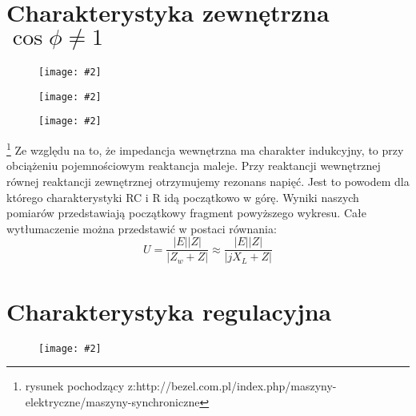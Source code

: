 \documentclass[12pt]{article}
\newcommand{\obrazek}[2]
{
	\begin{figure}[H]
	\centering
	\texttt{[image: \#2]}
	\end{figure}
}
\begin{document}
\section{Charakterystyka zewnętrzna $\cos\phi\neq1$}
	\obrazek{5}{tabele/cosfinie1}
	\obrazek{12}{wykresy/cosfinie1}
	\obrazek{12}{wykresy/wytlumaczenie}\footnote{rysunek pochodzący z:\newline http://bezel.com.pl/index.php/maszyny-elektryczne/maszyny-synchroniczne}
	Ze względu na to, że impedancja wewnętrzna ma charakter indukcyjny, to przy obciążeniu pojemnościowym reaktancja maleje. Przy reaktancji wewnętrznej równej reaktancji zewnętrznej otrzymujemy rezonans napięć. Jest to powodem dla którego charakterystyki RC i R idą początkowo w górę. 
	Wyniki naszych pomiarów przedstawiają początkowy fragment powyższego wykresu.
	Całe wytłumaczenie można przedstawić w postaci równania:
	\begin{equation}
	U=\frac{|E||Z|}{|Z_w+Z|}\approx \frac{|E||Z|}{|jX_L+Z|}
	\end{equation}


\section{Charakterystyka regulacyjna}
	\obrazek{12}{wykresy/regula}
\end{document}
